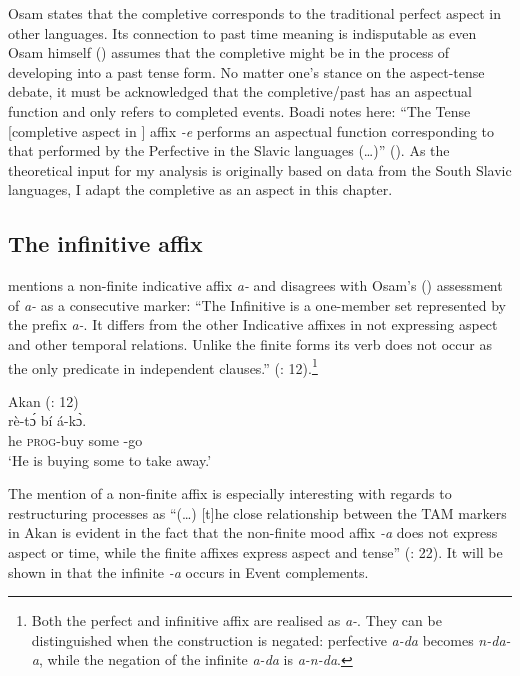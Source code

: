 \documentclass[output=paper]{langscibook}
\begin{document}
Osam states that the completive corresponds to the traditional perfect aspect in other languages. Its connection to past time meaning is indisputable as even Osam himself (\citeyear[87]{osam2008}) assumes that the completive might be in the process of developing into a past tense form. No matter one’s stance on the aspect-tense debate, it must be acknowledged that the completive/past has an aspectual function and only refers to completed events. Boadi notes here: “The  Tense [completive aspect in \citet{osam2008}] affix \emph{-e} performs an aspectual function corresponding to that performed by the Perfective in the Slavic languages (…)” (\citeyear[29]{osam2008}). As the theoretical input for my analysis is originally based on data from the South Slavic languages, I adapt the completive as an aspect in this chapter. 

\subsection{The infinitive affix}

\citet{boadi2008} mentions a non-finite indicative affix \emph{a-} and disagrees with Osam’s (\citeyear{osam2008}) assessment of \emph{a-} as a consecutive marker: “The Infinitive is a one-member set represented by the prefix \emph{a-}. It differs from the other Indicative affixes in not expressing aspect and other temporal relations. Unlike the finite forms its verb does not occur as the only predicate in independent clauses.” (\citealt{boadi2008}: 12).\footnote{Both the perfect and infinitive affix are realised as \emph{a-}. They can be distinguished when the construction is negated: perfective \emph{a-da} becomes \emph{n-da-a}, while the negation of the infinite \emph{a-da} is \emph{a-n-da}.}

\begin{exe}
\ex \label{Paj10} Akan (\citealt{boadi2008}: 12) \\ 
 {rè-t\'{ɔ}}  {bí} {á-k\`{{ɔ}}.}\\
    he \textsc{prog}-buy some -go\\
\glt `He is buying some to take away.’\\
\end{exe}



The mention of a non-finite affix is especially interesting with regards to restructuring processes as “(…) [t]he close relationship between the TAM markers in Akan is evident in the fact that the non-finite mood affix \emph{-a} does not express aspect or time, while the finite affixes express aspect and tense” (\citealt{owusu2014}: 22). It will be shown in  that the infinite \emph{-a} occurs in Event complements. 
\end{document}
